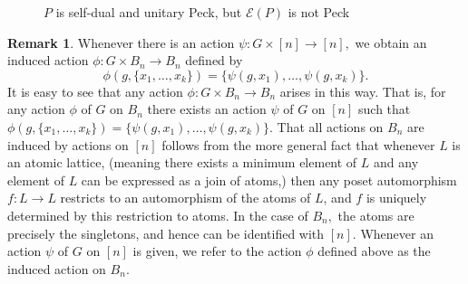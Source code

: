 \documentclass[10 pt]{amsart}
\theoremstyle{plain}
\theoremstyle{definition}
\newtheorem{rem}[thm]{Remark}
\theoremstyle{remark}
\numberwithin{equation}{section}
\begin{document}
\begin{figure}[h]
\label{fig:dual_not_unimodal}

\qquad
{}
\caption{$P$ is self-dual and unitary Peck, but $\mathcal{E}(P)$ is not Peck}
\end{figure}


\begin{rem}
\label{rem:induced_action_bn}
Whenever there is an action $\psi:G \times [n] \rightarrow [n],$ we obtain an induced action $\phi: G \times B_n \rightarrow B_n$ defined by
$$\phi(g,\{x_1,\ldots, x_k\}) = \{\psi(g,x_1),\ldots, \psi(g,x_k)\}.$$
It is easy to see that any action $\phi:G \times B_n \rightarrow B_n$ arises in this way. That is, for any action $\phi$ of $G$ on $B_n$ there exists an action $\psi$ of $G$ on $[n]$ such that $\phi(g,\{x_1,\ldots, x_k\}) = \{\psi(g,x_1),\ldots, \psi(g,x_k)\}.$ That all actions on $B_n$ are induced by actions on $[n]$ follows from the more general fact that whenever $L$ is an atomic lattice, (meaning there exists a minimum element of $L$ and any element of $L$ can be expressed as a join of atoms,) then any poset automorphism $f:L \rightarrow L$ restricts to an automorphism of the atoms of $L$, and $f$ is uniquely determined by this restriction to atoms. In the case of $B_n,$ the atoms are precisely the singletons, and hence can be identified with $[n]$.  Whenever an action $\psi$ of $G$ on $[n]$ is given, we refer to the action $\phi$ defined above as the induced action on $B_n.$
\end{rem}
\end{document}
